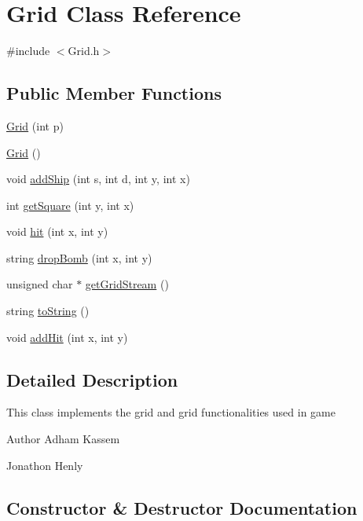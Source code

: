 \hypertarget{classGrid}{}\section{Grid Class Reference}
\label{classGrid}


{\ttfamily \#include $<$Grid.\+h$>$}

\subsection*{Public Member Functions}
\begin{DoxyCompactItemize}
\item 
\hyperlink{classGrid_a2d8f94be7fddec75f8a5fcd39cfcf3cb}{Grid} (int p)
\item 
\hyperlink{classGrid_a4ac9ff4f63552b4c61ff90fcb35ad66c}{Grid} ()
\item 
void \hyperlink{classGrid_a713d836d20af92af9f88849406267ea0}{add\+Ship} (int s, int d, int y, int x)
\item 
int \hyperlink{classGrid_aecf93fb530503819997f56c8e9dc282c}{get\+Square} (int y, int x)
\item 
void \hyperlink{classGrid_a8d0393b3b893d201b4afd9062487a59f}{hit} (int x, int y)
\item 
string \hyperlink{classGrid_ac379e67e40e0cebc8d37dfba4147dfb0}{drop\+Bomb} (int x, int y)
\item 
unsigned char $\ast$ \hyperlink{classGrid_aeb14a686f7219799a7796fc4f270f5d9}{get\+Grid\+Stream} ()
\item 
string \hyperlink{classGrid_adde29f8454547c9e81ce2b3c2e95bc43}{to\+String} ()
\item 
void \hyperlink{classGrid_afffe02cb1a0511678d6fb20ff3db1236}{add\+Hit} (int x, int y)
\end{DoxyCompactItemize}


\subsection{Detailed Description}
This class implements the grid and grid functionalities used in game \begin{DoxyAuthor}{Author}
Adham Kassem 

Jonathon Henly 
\end{DoxyAuthor}


\subsection{Constructor \& Destructor Documentation}
\mbox{\label{classGrid_a2d8f94be7fddec75f8a5fcd39cfcf3cb}} 
